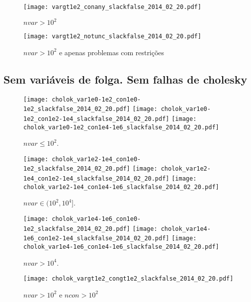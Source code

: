 \documentclass{article}
\begin{document}
\begin{figure}[H]
\centering
\texttt{[image: vargt1e2\_conany\_slackfalse\_2014\_02\_20.pdf]}
\caption{ $nvar > 10^2$ }
\label{fig:nvar_medium_and_big}
\end{figure}

\begin{figure}[H]
\centering
\texttt{[image: vargt1e2\_notunc\_slackfalse\_2014\_02\_20.pdf]}
\caption{ $nvar > 10^2$ e apenas problemas com restrições }
\label{fig:nvar_medium_and_big_not_unc}
\end{figure}

\newpage
\subsection{Sem variáveis de folga. Sem falhas de cholesky}

\begin{figure}[H]
\centering
\texttt{[image: cholok\_var1e0-1e2\_con1e0-1e2\_slackfalse\_2014\_02\_20.pdf]}
\texttt{[image: cholok\_var1e0-1e2\_con1e2-1e4\_slackfalse\_2014\_02\_20.pdf]}
\texttt{[image: cholok\_var1e0-1e2\_con1e4-1e6\_slackfalse\_2014\_02\_20.pdf]}
\caption{ $nvar \leq 10^2$. }
\label{fig:nvar_small}
\end{figure}
\begin{figure}[H]
\centering
\texttt{[image: cholok\_var1e2-1e4\_con1e0-1e2\_slackfalse\_2014\_02\_20.pdf]}
\texttt{[image: cholok\_var1e2-1e4\_con1e2-1e4\_slackfalse\_2014\_02\_20.pdf]}
\texttt{[image: cholok\_var1e2-1e4\_con1e4-1e6\_slackfalse\_2014\_02\_20.pdf]}
\caption{ $nvar \in (10^2,10^4]$. }
\label{fig:nvar_medium}
\end{figure}
\begin{figure}[H]
\centering
\texttt{[image: cholok\_var1e4-1e6\_con1e0-1e2\_slackfalse\_2014\_02\_20.pdf]}
\texttt{[image: cholok\_var1e4-1e6\_con1e2-1e4\_slackfalse\_2014\_02\_20.pdf]}
\texttt{[image: cholok\_var1e4-1e6\_con1e4-1e6\_slackfalse\_2014\_02\_20.pdf]}
\caption{ $nvar > 10^4$. }
\label{fig:nvar_big}
\end{figure}

\begin{figure}[H]
\centering
\texttt{[image: cholok\_vargt1e2\_congt1e2\_slackfalse\_2014\_02\_20.pdf]}
\caption{ $nvar > 10^2$ e $ncon > 10^2$ }
\label{fig:both_medium_and_big}
\end{figure}
\end{document}
